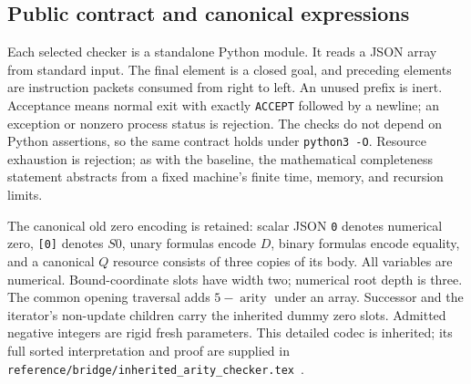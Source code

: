 \documentclass[11pt]{article}
\theoremstyle{definition}\newtheorem{definition}[theorem]{Definition}
\theoremstyle{remark}\newtheorem{remark}[theorem]{Remark}
\newcommand{\file}[1]{\texttt{#1}}
\begin{document}
\subsection{Public contract and canonical expressions}

Each selected checker is a standalone Python module. It reads a JSON array
from standard input. The final element is a closed goal, and preceding
elements are instruction packets consumed from right to left. An unused
prefix is inert. Acceptance means normal exit with exactly
\file{ACCEPT} followed by a newline; an exception or nonzero process status
is rejection. The checks do not depend on Python assertions, so the same
contract holds under \file{python3 -O}. Resource exhaustion is rejection;
as with the baseline, the mathematical completeness statement abstracts
from a fixed machine's finite time, memory, and recursion limits.

The canonical old zero encoding is retained: scalar JSON \file{0} denotes
numerical zero, \file{[0]} denotes $S0$, unary formulas encode $D$, binary
formulas encode equality, and a canonical $Q$ resource consists of three
copies of its body. All variables are numerical. Bound-coordinate slots have
width two; numerical root depth is three. The common opening traversal adds
$5-\operatorname{arity}$ under an array. Successor and the iterator's
non-update children carry the inherited dummy zero slots. Admitted negative
integers are rigid fresh parameters. This detailed codec is inherited; its
full sorted interpretation and proof are supplied in
\file{reference/bridge/inherited\_arity\_checker.tex}~\cite{generated}.
\end{document}
